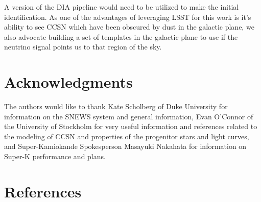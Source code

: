 \documentclass[12pt, letterpaper]{article}
\begin{document}
A version of the DIA pipeline would need to be utilized to make the
initial identification.  As one of the advantages of leveraging LSST
for this work is it's ability to see CCSN which have been obscured by
dust in the galactic plane, we also advocate building a set of
templates in the galactic plane to use if the neutrino signal points
us to that region of the sky.

\section{Acknowledgments}

The authors would like to thank Kate Scholberg of Duke University for
information on the SNEWS system and general information, Evan O'Connor
of the University of Stockholm for very useful information and
references related to the modeling of CCSN and properties of the
progenitor stars and light curves, and Super-Kamiokande Spokesperson
Masayuki Nakahata for information on Super-K performance and plans.

\section{References}

 

\end{document}
